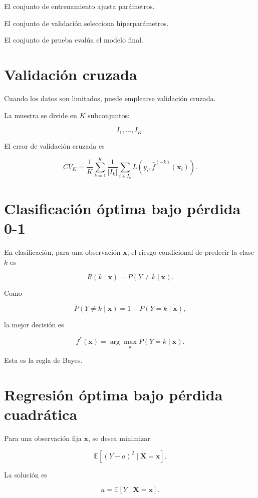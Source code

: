\documentclass[
  spanish,
  11pt,
  letterpaper,
  DIV=11,
  numbers=noendperiod]{scrreprt}
\theoremstyle{definition}
\theoremstyle{plain}
\theoremstyle{definition}
\theoremstyle{remark}
\begin{document}
El conjunto de entrenamiento ajusta parámetros.

El conjunto de validación selecciona hiperparámetros.

El conjunto de prueba evalúa el modelo final.

\section{Validación cruzada}\label{validaciuxf3n-cruzada}

Cuando los datos son limitados, puede emplearse validación cruzada.

La muestra se divide en \(K\) subconjuntos:

\[
I_1,\ldots,I_K.
\]

El error de validación cruzada es

\[
CV_K
=
\frac{1}{K}
\sum_{k=1}^{K}
\frac{1}{|I_k|}
\sum_{i\in I_k}
L
\left(
y_i,
\widehat{f}^{(-k)}(\mathbf{x}_i)
\right).
\]

\section{Clasificación óptima bajo pérdida
0-1}\label{clasificaciuxf3n-uxf3ptima-bajo-puxe9rdida-0-1}

En clasificación, para una observación \(\mathbf{x}\), el riesgo
condicional de predecir la clase \(k\) es

\[
R(k\mid\mathbf{x})
=
P(Y\neq k\mid\mathbf{x}).
\]

Como

\[
P(Y\neq k\mid\mathbf{x})
=
1-P(Y=k\mid\mathbf{x}),
\]

la mejor decisión es

\[
f^{*}(\mathbf{x})
=
\arg\max_k
P(Y=k\mid\mathbf{x}).
\]

Esta es la regla de Bayes.

\section{Regresión óptima bajo pérdida
cuadrática}\label{regresiuxf3n-uxf3ptima-bajo-puxe9rdida-cuadruxe1tica}

Para una observación fija \(\mathbf{x}\), se desea minimizar

\[
\mathbb{E}
\left[
(
Y-a
)^2
\mid
\mathbf{X}=\mathbf{x}
\right].
\]

La solución es

\[
a
=
\mathbb{E}
[
Y\mid\mathbf{X}=\mathbf{x}
].
\]
\end{document}
